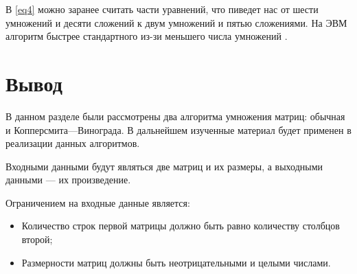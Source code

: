 В \ref{eq4} можно заранее считать части уравнений, что пиведет нас от шести умножений и десяти сложений к двум умножений и пятью сложениями. На ЭВМ алгоритм быстрее стандартного из-зи меньшего числа умножений \cite{williams2012multiplying}.

\section{Вывод}

В данном разделе были рассмотрены два алгоритма умножения матриц: обычная и Копперсмита---Винограда. В дальнейшем изученные материал будет применен в реализации данных алгоритмов. 

Входными данными будут являться две матриц и их размеры, а выходными данными --- их произведение. 

Ограничением на входные данные является:
\begin{itemize}
    \item Количество строк первой матрицы должно быть равно количеству столбцов второй;
    \item Размерности матриц должны быть неотрицательными и целыми числами.
\end{itemize}
